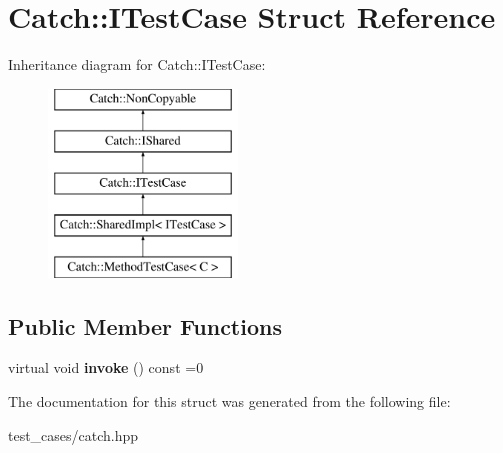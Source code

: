 \hypertarget{structCatch_1_1ITestCase}{}\section{Catch\+:\+:I\+Test\+Case Struct Reference}
\label{structCatch_1_1ITestCase}
Inheritance diagram for Catch\+:\+:I\+Test\+Case\+:\begin{figure}[H]
\begin{center}
\leavevmode
\includegraphics[height=5.000000cm]{structCatch_1_1ITestCase}
\end{center}
\end{figure}
\subsection*{Public Member Functions}
\begin{DoxyCompactItemize}
\item 
\mbox{\label{structCatch_1_1ITestCase_a678825e62e7c17297621cfeb65588c34}} 
virtual void {\bfseries invoke} () const =0
\end{DoxyCompactItemize}


The documentation for this struct was generated from the following file\+:\begin{DoxyCompactItemize}
\item 
test\+\_\+cases/catch.\+hpp\end{DoxyCompactItemize}
